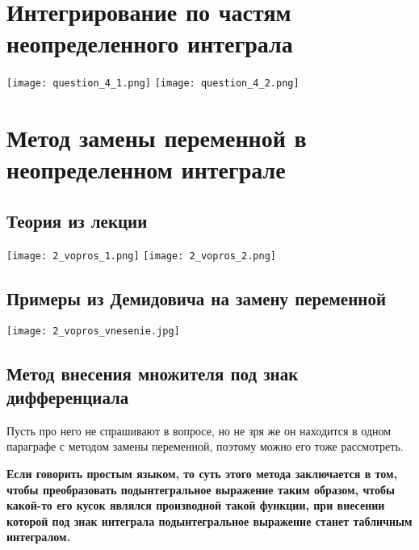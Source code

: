 \documentclass[a4paper,12pt]{article}
\begin{document}
\section{Интегрирование по частям неопределенного интеграла}
\texttt{[image: question\_4\_1.png]}
\texttt{[image: question\_4\_2.png]}

\section{Метод замены переменной в неопределенном интеграле}

\subsection{Теория из лекции}
\texttt{[image: 2\_vopros\_1.png]}
\texttt{[image: 2\_vopros\_2.png]}

\subsection{Примеры из Демидовича на замену переменной}
\texttt{[image: 2\_vopros\_vnesenie.jpg]}

\subsection{Метод внесения множителя под знак дифференциала}
Пусть про него не спрашивают в вопросе, но не зря же он находится в одном параграфе с методом замены переменной, поэтому можно его тоже рассмотреть.

\textbf{Если говорить простым языком, то суть этого метода заключается в том, чтобы преобразовать подынтегральное выражение таким образом, чтобы какой-то его кусок являлся производной такой функции, при внесении которой под знак интеграла подынтегральное выражение станет табличным интегралом.}
\end{document}
